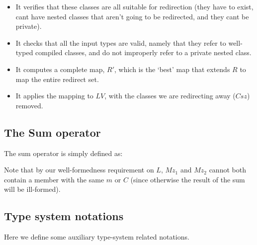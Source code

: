\begin{itemize}
\begin{itemize}
		\item It verifies that these classes are all suitable for redirection (they have to exist, cant have nested classes that aren't going to be redirected, and they cant be private).
		\item It checks that all the input types are valid, namely that they refer to well-typed compiled classes, and do not improperly refer to a private nested class.
		\item It computes a complete map, $R'$, which is the `best' map that extends  $R$ to map the entire redirect set.
		\item It applies the mapping to $LV$, with the classes we are redirecting away ($Csz$) removed.
	\end{itemize}
\end{itemize}

\subsection{The Sum operator}
The sum operator is simply defined as:

\begin{defs}
{}
{}
\end{defs}
Note that by our well-formedness requirement on $L$, $Mz_1$ and $Mz_2$ cannot both contain a member with the same $m$ or $C$ (since otherwise the result of the sum will be ill-formed).

\subsection{Type system notations}
Here we define some auxiliary type-system related notations.

